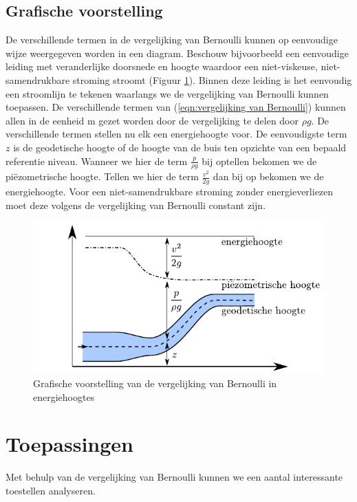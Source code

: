		\subsection{Grafische voorstelling}
De verschillende termen in de vergelijking van Bernoulli kunnen op eenvoudige wijze weergegeven worden in een diagram. Beschouw bijvoorbeeld een eenvoudige leiding met veranderlijke doorsnede en hoogte waardoor een niet-viskeuse, niet-samendrukbare stroming stroomt (Figuur \ref{fig:energiehoogte}). Binnen deze leiding is het eenvoudig een stroomlijn te tekenen waarlangs we de vergelijking van Bernoulli kunnen toepassen. De verschillende termen van (\ref{eqn:vergelijking van Bernoulli}) kunnen allen in de eenheid \unit{}{m} gezet worden door de vergelijking te delen door $\rho g$. De verschillende termen stellen nu elk een energiehoogte voor. De eenvoudigste term $z$ is de geodetische hoogte of de hoogte van de buis ten opzichte van een bepaald referentie niveau. Wanneer we hier de term $\frac{p}{\rho g}$ bij optellen bekomen we de pi\"ezometrische hoogte. Tellen we hier de term $\frac{v^2}{2 g}$ dan bij op bekomen we de energiehoogte. Voor een niet-samendrukbare stroming zonder energieverliezen moet deze volgens de vergelijking van Bernoulli constant zijn.
\begin{figure}[htb]
	\centering
	\includegraphics{fig/deeltjesvergelijkingen/Energiehoogte}
	\caption{Grafische voorstelling van de vergelijking van Bernoulli in energiehoogtes}
	\label{fig:energiehoogte}
\end{figure}

	\section{Toepassingen}
Met behulp van de vergelijking van Bernoulli kunnen we een aantal interessante toestellen analyseren.
